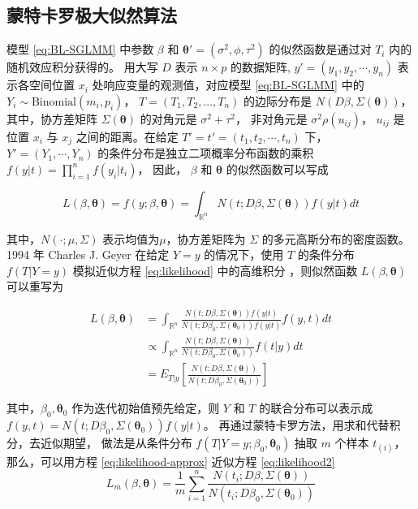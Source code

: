 \documentclass[12pt,a4paper,UTF8,twoside]{book}
\theoremstyle{definition}
\theoremstyle{definition}
\theoremstyle{definition}
\theoremstyle{remark}
\begin{document}
\hypertarget{MCML}{%
\subsection{蒙特卡罗极大似然算法}\label{MCML}}

模型 \eqref{eq:BL-SGLMM} 中参数 \(\beta\) 和
\(\boldsymbol{\theta}' = (\sigma^2,\phi,\tau^2)\) 的似然函数是通过对
\(T_i\) 内的随机效应积分获得的。 用大写 \(D\) 表示 \(n\times p\)
的数据矩阵, \(y' = (y_1,y_2,\cdots,y_n)\) 表示各空间位置 \(x_i\)
处响应变量的观测值，对应模型 \eqref{eq:BL-SGLMM} 中的
\(Y_i \sim \mathrm{Binomial}(m_i,p_i)\)， \(T = (T_1,T_2,\ldots,T_n)\)
的边际分布是 \(N(D\beta, \Sigma(\boldsymbol{\theta}))\)，
其中，协方差矩阵 \(\Sigma(\boldsymbol{\theta})\) 的对角元是
\(\sigma^2+\tau^2\)， 非对角元是 \(\sigma^2\rho(u_{ij})\)， \(u_{ij}\)
是位置 \(x_i\) 与 \(x_j\) 之间的距离。在给定
\(T'=t'=(t_1,t_2,\cdots,t_n)\) 下， \(Y'=(Y_1,\cdots,Y_n)\)
的条件分布是独立二项概率分布函数的乘积
\(f(y|t)=\prod_{i=1}^{n}f(y_{i}|t_{i})\)， 因此， \(\beta\) 和
\(\boldsymbol{\theta}\) 的似然函数可以写成

\begin{equation}
L(\beta,\boldsymbol{\theta}) = f(y;\beta,\boldsymbol{\theta}) = \int_{\mathbb{R}^{n}}N(t;D\beta,\Sigma(\boldsymbol{\theta}))f(y|t)dt \label{eq:likelihood}
\end{equation}

\noindent 其中，\(N(\cdot;\mu,\Sigma)\) 表示均值为\(\mu\)，协方差矩阵为
\(\Sigma\) 的多元高斯分布的密度函数。 1994 年 Charles J. Geyer 在给定
\(Y=y\) 的情况下，使用 \(T\) 的条件分布 \(f(T|Y=y)\) 模拟近似方程
\eqref{eq:likelihood} 中的高维积分 \citep{Geyer1994On}，则似然函数
\(L(\beta,\boldsymbol{\theta})\) 可以重写为

\begin{equation}
\begin{aligned}
L(\beta,\boldsymbol{\theta})
& = \int_{\mathbb{R}^{n}} \frac{N(t;D\beta,\Sigma(\boldsymbol{\theta}))f(y|t)}{N(t;D\beta_{0},\Sigma(\boldsymbol{\theta}_{0}))f(y|t)}f(y,t)dt \\
& \varpropto \int_{\mathbb{R}^{n}} \frac{N(t;D\beta, \Sigma(\boldsymbol{\theta}))}{N(t;D\beta_{0}, \Sigma(\boldsymbol{\theta}_{0}))}f(t|y)dt \\
&= E_{T|y}\left[\frac{N(t; D\beta, \Sigma(\boldsymbol{\theta}))}{N(t; D\beta_{0}, \Sigma(\boldsymbol{\theta}_{0}))}\right] 
\end{aligned} \label{eq:likelihood2}
\end{equation}

\noindent 其中，\(\beta_{0},\boldsymbol{\theta}_{0}\)
作为迭代初始值预先给定，则 \(Y\) 和 \(T\) 的联合分布可以表示成
\(f(y,t)=N(t;D\beta_{0},\Sigma(\boldsymbol{\theta}_{0}))f(y|t)\)。
再通过蒙特卡罗方法，用求和代替积分，去近似期望， 做法是从条件分布
\(f(T|Y=y;\beta_0,\boldsymbol{\theta}_0)\) 抽取 \(m\) 个样本
\(t_{(i)}\)， 那么，可以用方程 \eqref{eq:likelihood-approx} 近似方程
\eqref{eq:likelihood2} \begin{equation}
L_{m}(\beta,\boldsymbol{\theta})=\frac{1}{m}\sum_{i=1}^{n}\frac{N(t_{i};D\beta,\Sigma(\boldsymbol{\theta}))}{N(t_{i};D\beta_{0},\Sigma(\boldsymbol{\theta}_{0}))} \label{eq:likelihood-approx}
\end{equation}
\end{document}
